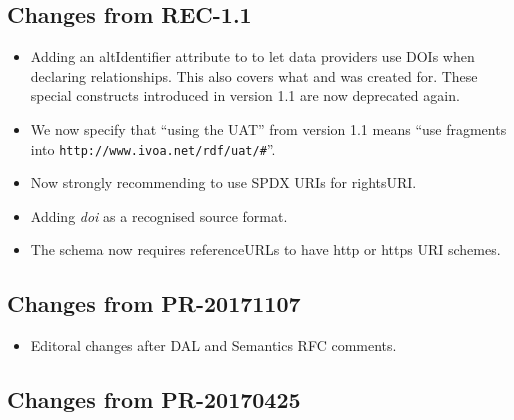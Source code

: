 \documentclass[11pt,a4paper]{ivoa}
\begin{document}
\subsection{Changes from REC-1.1}

\begin{itemize}
\item Adding an altIdentifier attribute to  to
let  data providers use DOIs when declaring relationships.  This also
covers what  and
 was created for.  These special
constructs introduced in version 1.1 are now deprecated again.

\item We now specify that ``using the UAT'' from version 1.1 means ``use
fragments into \nolinkurl{http://www.ivoa.net/rdf/uat/#}''.

\item Now strongly recommending to use SPDX URIs for rightsURI.

\item Adding \emph{doi} as a recognised source format.

\item The schema now requires referenceURLs to have http or https URI schemes.

\end{itemize}

\subsection{Changes from PR-20171107}

\begin{itemize}
\item Editoral changes after DAL and Semantics RFC comments.
\end{itemize}

\subsection{Changes from PR-20170425}
\end{document}
